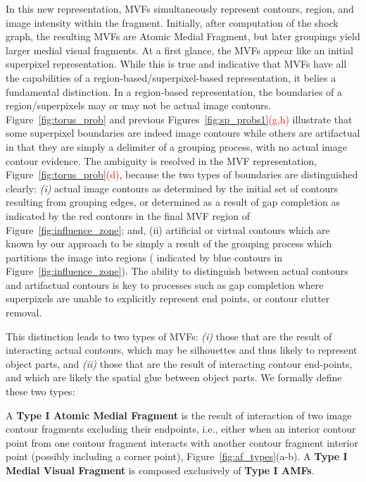 In this new representation, MVFs simultaneously represent contours, region, and image intensity within the fragment. Initially, after computation of the shock graph, the resulting MVFs are Atomic Medial Fragment, but later groupings yield larger medial visual fragments. At a first glance, the MVFs appear like an initial superpixel representation. While this is true and indicative that MVFs have all the capabilities of a region-based/superpixel-based representation, it belies a fundamental distinction. In a region-based representation, the boundaries of a region/superpixels may or may not be actual image contours. Figure~\ref{fig:torus_prob} and previous Figures~\ref{fig:sp_probs1}\textcolor{red}{(g,h)} illustrate that some superpixel boundaries are indeed image contours while others are artifactual in that they are simply a delimiter of a grouping process, with no actual image contour evidence. The ambiguity is resolved in the MVF representation, Figure~\ref{fig:torus_prob}\textcolor{red}{(d)}, because the two types of boundaries are distinguished clearly: \emph{(i)} actual image contours as determined by the initial set of contours resulting from grouping edges, or determined as a result of gap completion as indicated by the red contours in the final MVF region of Figure~\ref{fig:influence_zone}; and, (ii) artificial or virtual contours which are known by our approach to be simply a result of the grouping process which partitions the image into regions ( indicated by blue contours in Figure~\ref{fig:influence_zone}). The ability to distinguish between actual contours and artifactual contours is key to processes such as gap completion where superpixels are unable to explicitly represent end points, or contour clutter removal.






 This distinction leads to two types of MVFs: \emph{(i)} those that are the result of interacting actual contours, which may be silhouettes and thus likely to represent object parts, and \emph{(ii)} those that are the result of interacting contour end-points, and which are likely the spatial glue between object parts. We formally define these two types: 


\begin{definition}
A {\bf Type I Atomic Medial Fragment} is the result of interaction of two image contour fragments excluding their endpoints, i.e., either when an interior contour point from one contour fragment interacts with another contour fragment interior point (possibly including a corner point), Figure~\ref{fig:af_types}(a-b). A {\bf Type I Medial Visual Fragment} is composed exclusively of {\bf Type I AMFs}. 
\end{definition}

